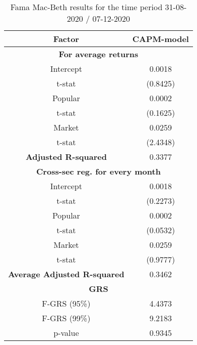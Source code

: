 \begin{table}[h!]
	\centering
	\captionsetup{skip=0.5\baselineskip}
	\caption{Fama Mac-Beth results for the time period 31-08-2020 / 07-12-2020}
	\begin{tabular}{|c|c|}
		\hline
		\textbf{Factor} & \textbf{CAPM-model} \\ \hline
		\multicolumn{2}{|c|}{\textbf{For average returns}} \\ \hline
		Intercept & 0.0018 \\ 
		t-stat & (0.8425) \\ \hline
		Popular & 0.0002 \\ 
		t-stat & (0.1625)\\ \hline
		Market & 0.0259 \\
		t-stat & (2.4348)\\ \hline
		\textbf{Adjusted R-squared} & 0.3377 \\ \hline
		\multicolumn{2}{|c|}{\textbf{Cross-sec reg. for every month}} \\ \hline
		Intercept & 0.0018 \\ 
		t-stat & (0.2273) \\ \hline
		Popular & 0.0002 \\ 
		t-stat & (0.0532)\\ \hline
		Market & 0.0259 \\
		t-stat & (0.9777)\\ \hline
		\textbf{Average Adjusted R-squared} & 0.3462 \\ \hline
		\multicolumn{2}{|c|}{\textbf{GRS}} \\ \hline
		F-GRS (95\%) & 4.4373 \\ \hline
		F-GRS (99\%) & 9.2183 \\ \hline
		p-value & 0.9345 \\ \hline
	\end{tabular}
\end{table}

